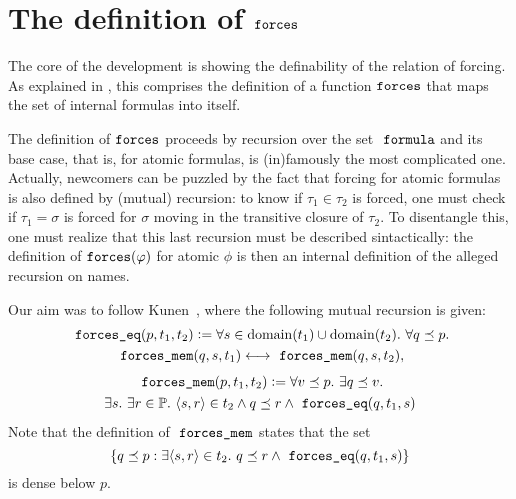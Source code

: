 \section{The definition of $\mathop{\mathtt{forces}}$}

The core of the development is showing the definability of the
relation of forcing. As explained in
\cite[Sect.~8]{2019arXiv190103313G}, this comprises the 
definition of a function $\mathop{\mathtt{forces}}$ that maps the set of internal
formulas into itself. 

The definition of $\mathop{\mathtt{forces}}$ proceeds by recursion
over the set $\formula$ and its base case, that is, for
atomic formulas, is (in)famously the most complicated one. Actually,
newcomers can be puzzled by the fact that forcing for atomic
formulas is also defined by (mutual) recursion: to know if $\tau_1\in\tau_2$ is
forced, one must check if $\tau_1=\sigma$ is forced for $\sigma$
moving in the transitive closure of $\tau_2$. To disentangle this, one
must realize that this last recursion must be described sintactically:
the definition of $\mathop{\mathtt{forces}}(\varphi)$ for atomic $\phi$ is then an
internal definition of the alleged recursion on names. 

Our aim was to follow Kunen~\cite[p.~257]{kunen2011set}, where the
following mutual recursion is given:
\begin{multline}\label{eq:def-forcing-equality}
  \forceseq (p,t_1,t_2) \defi 
  \forall s\in\dom(t_1)\cup\dom(t_2).\ \forall q\pleq p .\\
  \forcesmem(q,s,t_1)\lsii 
  \forcesmem(q,s,t_2),
\end{multline}
\begin{multline}\label{eq:def-forcing-membership}
  \forcesmem(p,t_1,t_2) \defi  \forall v\pleq p. \ \exists q\pleq v. \\
  \exists s.\ \exists r\in \PP .\ \lb s,r\rb \in
      t_2 \land q \pleq r \land \forceseq(q,t_1,s)
\end{multline}
Note that the definition of $\forcesmem$ states that the set 
\[
\{q\pleq p : \exists \lb s,r\rb\in t_2 . \ q\pleq r \land \forceseq(q,t_1,s)\}
\]
is dense below $p$.

